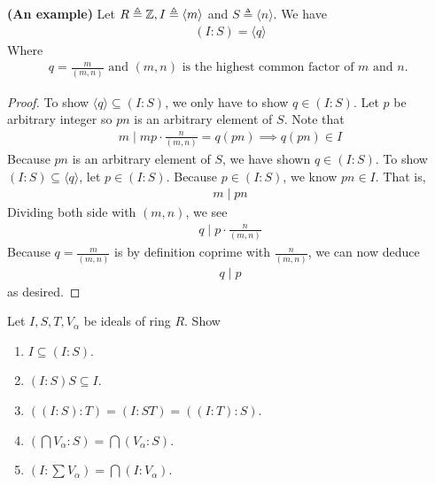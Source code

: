 \documentclass{report}
\begin{document}
\begin{theorem}
\textbf{(An example)} Let $R\triangleq \mathbb{Z},I\triangleq \langle m\rangle$ and $S\triangleq \langle n\rangle $. We have 
\begin{align*}
  (I:S)=\langle q\rangle 
\end{align*}
Where  
\begin{align*}
q= \frac{m}{(m,n)}\text{ and }(m,n)\text{ is the highest common factor of $m$ and $n$. }
\end{align*}
\end{theorem}
\begin{proof}
To show $\langle q\rangle \subseteq (I:S)$, we only have to show $q \in (I:S)$. Let $p$ be arbitrary integer so $pn$ is an arbitrary element of  $S$. Note that 
\begin{align*}
m \mid mp \cdot \frac{n}{(m,n)} =  q (pn) \implies  q(pn) \in I
\end{align*}
Because $pn$ is an arbitrary element of  $S$, we have shown  $q\in (I:S)$. To show $(I:S)\subseteq \langle q\rangle $, let $p \in (I:S)$. Because $p \in (I:S)$, we know $pn\in I$. That is, 
\begin{align*}
m \mid  pn
\end{align*}
Dividing both side with $(m,n)$, we see  
\begin{align*}
q \mid p \cdot \frac{n}{(m,n)} 
\end{align*}
Because $q= \frac{m}{(m,n)}$ is by definition coprime with $\frac{n}{(m,n)}$, we can now deduce 
\begin{align*}
q \mid p 
\end{align*}
as desired.
\end{proof}
\begin{question}{}{}
Let $I,S,T,V_\alpha $ be ideals of ring $R$. Show 
\begin{enumerate}[label=(\alph*)]
  \item $I \subseteq (I:S)$. 
  \item $(I:S)S \subseteq I$. 
  \item $((I:S):T)=(I:ST)=((I:T):S)$. 
  \item $(\bigcap  V_\alpha : S)= \bigcap  (V_\alpha :S)$. 
  \item $(I: \sum V_\alpha )=\bigcap (I:V_\alpha )$. 
\end{enumerate}
\end{question}
\end{document}
